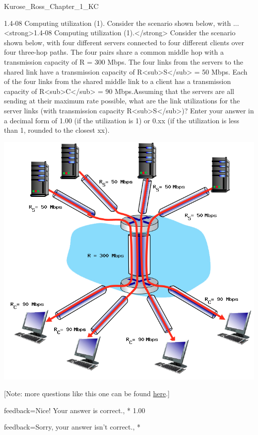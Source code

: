 \documentclass[a4paper]{article}
\begin{document}
\begin{quiz}{Kurose_Ross_Chapter_1_KC}
\begin{shortanswer}[
	points=1,
	penalty=0.33333,
]{1.4-08 Computing utilization (1). Consider the scenario shown below, with ...}
<strong>1.4-08 Computing utilization (1).</strong> Consider the scenario shown below, with four different servers connected to four different clients over four three-hop paths. The four pairs share a common middle hop with a transmission capacity of R = 300 Mbps. The four links from the servers to the shared link have a transmission capacity of R<sub>S</sub> = 50 Mbps. Each of the four links from the shared middle link to a client has a transmission capacity of R<sub>C</sub> = 90 Mbps.Assuming that the servers are all sending at their maximum rate possible, what are the link utilizations for the server links (with transmission capacity R<sub>S</sub>)? Enter your answer in a decimal form of 1.00 (if the utilization is 1) or 0.xx (if the utilization is less than 1, rounded to the closest xx). 
\begin{center}
\includegraphics[width=\linewidth]{figs/1.4.7.png}
\end{center}
 [Note: more questions like this one can be found \href{http://gaia.cs.umass.edu/kurose_ross/interactive/end-end-throughput-simple.php}{here}.]
\item[feedback={Nice!  Your answer is correct.},]* 1.00
\item[feedback={Sorry, your answer isn't correct.},] *
\end{shortanswer}


\end{quiz}
\end{document}

